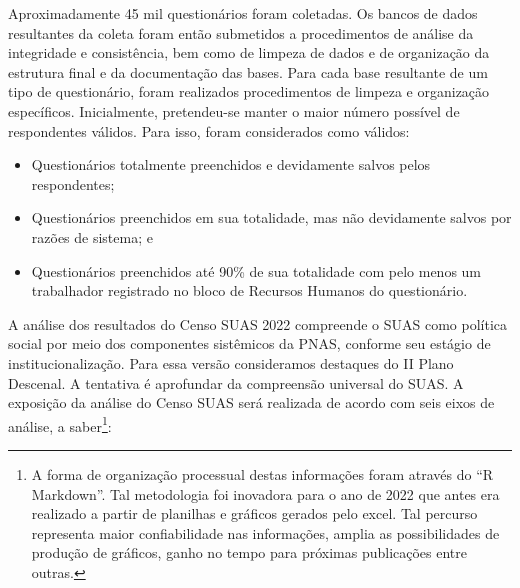 \documentclass[
  brazilian]{report}
\begin{document}
Aproximadamente 45 mil questionários foram coletadas. Os bancos de dados
resultantes da coleta foram então submetidos a procedimentos de análise
da integridade e consistência, bem como de limpeza de dados e de
organização da estrutura final e da documentação das bases. Para cada
base resultante de um tipo de questionário, foram realizados
procedimentos de limpeza e organização específicos. Inicialmente,
pretendeu-se manter o maior número possível de respondentes válidos.
Para isso, foram considerados como válidos:

\begin{itemize}
\item
  Questionários totalmente preenchidos e devidamente salvos pelos
  respondentes;
\item
  Questionários preenchidos em sua totalidade, mas não devidamente
  salvos por razões de sistema; e
\item
  Questionários preenchidos até 90\% de sua totalidade com pelo menos um
  trabalhador registrado no bloco de Recursos Humanos do questionário.
\end{itemize}

A análise dos resultados do Censo SUAS 2022 compreende o SUAS como
política social por meio dos componentes sistêmicos da PNAS, conforme
seu estágio de institucionalização. Para essa versão consideramos
destaques do II Plano Descenal. A tentativa é aprofundar da compreensão
universal do SUAS. A exposição da análise do Censo SUAS será realizada
de acordo com seis eixos de análise, a
saber\footnote{A forma de organização processual destas informações foram através do “R Markdown”. Tal metodologia foi inovadora para o ano de 2022 que antes era realizado a partir de planilhas e gráficos gerados pelo excel. Tal percurso representa maior confiabilidade nas informações, amplia as possibilidades de produção de gráficos, ganho no tempo para próximas publicações entre outras.}:
\end{document}
